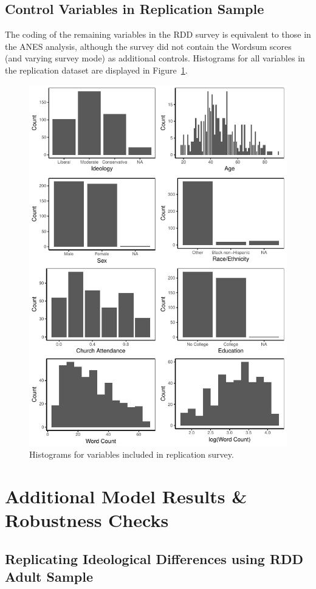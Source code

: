 \documentclass[12pt]{article}
\begin{document}
\clearpage
\subsection{Control Variables in Replication Sample}

The coding of the remaining variables in the RDD survey is equivalent to those in the ANES analysis, although the survey did not contain the Wordsum scores (and varying survey mode) as additional controls. Histograms for all variables in the replication dataset are displayed in Figure~\ref{fig:app_lidesc}.


\begin{figure}[h]\centering
\includegraphics[width=.67\textwidth]{../calc/fig/app_lidesc.pdf}
\caption{Histograms for variables included in replication survey.}\label{fig:app_lidesc}
\end{figure}


\clearpage
\section{Additional Model Results \& Robustness Checks}\label{app:robust}
\renewcommand\thefigure{\thesection.\arabic{figure}}
\renewcommand\thetable{\thesection.\arabic{table}}
\setcounter{figure}{0}
\setcounter{table}{0}



\subsection{Replicating Ideological Differences using RDD Adult Sample}
\end{document}
